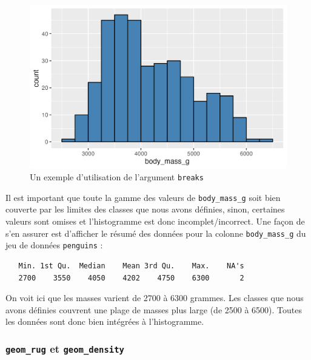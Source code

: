 \documentclass[
  letterpaper,
  DIV=11,
  numbers=noendperiod]{scrreprt}
\newenvironment{Shaded}{\begin{snugshade}}{\end{snugshade}}
\newcommand{\FunctionTok}[1]{\textcolor[rgb]{0.28,0.35,0.67}{#1}}
\newcommand{\NormalTok}[1]{\textcolor[rgb]{0.00,0.23,0.31}{#1}}
\newcommand{\SpecialCharTok}[1]{\textcolor[rgb]{0.37,0.37,0.37}{#1}}
\begin{document}
\begin{figure}[H]

{\centering \includegraphics{./03-visualization_files/figure-pdf/unnamed-chunk-18-1.png}

}

\caption{Un exemple d'utilisation de l'argument \texttt{breaks}}

\end{figure}

Il est important que toute la gamme des valeurs de
\texttt{body\_mass\_g} soit bien couverte par les limites des classes
que nous avons définies, sinon, certaines valeurs sont omises et
l'histogramme est donc incomplet/incorrect. Une façon de s'en assurer
est d'afficher le résumé des données pour la colonne
\texttt{body\_mass\_g} du jeu de données \texttt{penguins} :

\begin{Shaded}
\end{Shaded}

\begin{verbatim}
   Min. 1st Qu.  Median    Mean 3rd Qu.    Max.    NA's 
   2700    3550    4050    4202    4750    6300       2 
\end{verbatim}

On voit ici que les masses varient de 2700 à 6300 grammes. Les classes
que nous avons définies couvrent une plage de masses plus large (de 2500
à 6500). Toutes les données sont donc bien intégrées à l'histogramme.

\hypertarget{geom_rug-et-geom_density}{%
\subsubsection{\texorpdfstring{\texttt{geom\_rug} et
\texttt{geom\_density}}{geom\_rug et geom\_density}}\label{geom_rug-et-geom_density}}
\end{document}
